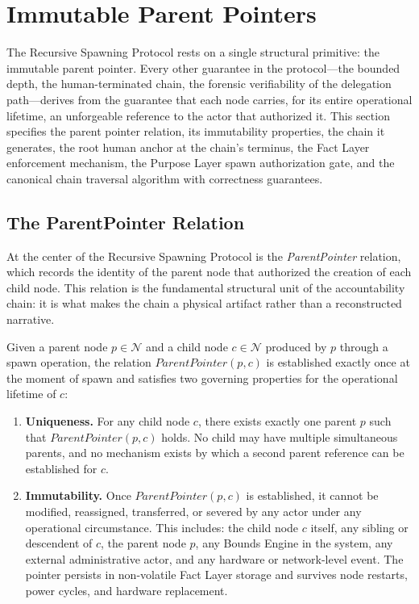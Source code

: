 \section{Immutable Parent Pointers}
\label{sec:immutable-parent-pointers}

The Recursive Spawning Protocol rests on a single structural primitive: the immutable parent pointer. Every other guarantee in the protocol—the bounded depth, the human-terminated chain, the forensic verifiability of the delegation path—derives from the guarantee that each node carries, for its entire operational lifetime, an unforgeable reference to the actor that authorized it. This section specifies the parent pointer relation, its immutability properties, the chain it generates, the root human anchor at the chain's terminus, the Fact Layer enforcement mechanism, the Purpose Layer spawn authorization gate, and the canonical chain traversal algorithm with correctness guarantees.

\subsection{The ParentPointer Relation}

At the center of the Recursive Spawning Protocol is the \textit{ParentPointer} relation, which records the identity of the parent node that authorized the creation of each child node. This relation is the fundamental structural unit of the accountability chain: it is what makes the chain a physical artifact rather than a reconstructed narrative.

\begin{definition}[ParentPointer]
\label{def:parent-pointer}
Given a parent node $p \in \mathcal{N}$ and a child node $c \in \mathcal{N}$ produced by $p$ through a spawn operation, the relation $\textit{ParentPointer}(p, c)$ is established exactly once at the moment of spawn and satisfies two governing properties for the operational lifetime of $c$:

\begin{enumerate}[noitemsep]
    \item \textbf{Uniqueness.} For any child node $c$, there exists exactly one parent $p$ such that $\textit{ParentPointer}(p, c)$ holds. No child may have multiple simultaneous parents, and no mechanism exists by which a second parent reference can be established for $c$.

    \item \textbf{Immutability.} Once $\textit{ParentPointer}(p, c)$ is established, it cannot be modified, reassigned, transferred, or severed by any actor under any operational circumstance. This includes: the child node $c$ itself, any sibling or descendent of $c$, the parent node $p$, any Bounds Engine in the system, any external administrative actor, and any hardware or network-level event. The pointer persists in non-volatile Fact Layer storage and survives node restarts, power cycles, and hardware replacement.
\end{enumerate}
\end{definition}

